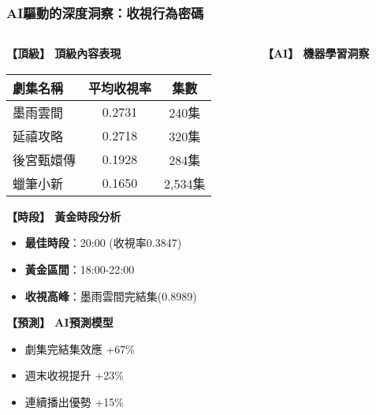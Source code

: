 \documentclass[10pt]{beamer}
\begin{document}
\begin{frame}
\frametitle{AI驅動的深度洞察：收視行為密碼}

\begin{columns}[T]
\begin{column}{0.6\textwidth}
\textbf{【頂級】 頂級內容表現}
\begin{table}[h]
\centering
\small
\begin{tabular}{@{}lcc@{}}
\toprule
\textbf{劇集名稱} & \textbf{平均收視率} & \textbf{集數} \\
\midrule
墨雨雲間 & 0.2731 & 240集 \\
延禧攻略 & 0.2718 & 320集 \\
後宮甄嬛傳 & 0.1928 & 284集 \\
蠟筆小新 & 0.1650 & 2,534集 \\
\bottomrule
\end{tabular}
\end{table}

\textbf{【時段】 黃金時段分析}
\begin{itemize}
    \item \textbf{最佳時段}：20:00 (收視率0.3847)
    \item \textbf{黃金區間}：18:00-22:00
    \item \textbf{收視高峰}：墨雨雲間完結集(0.8989)
\end{itemize}

\textbf{【預測】 AI預測模型}
\begin{itemize}
    \item 劇集完結集效應 +67\%
    \item 週末收視提升 +23\%
    \item 連續播出優勢 +15\%
\end{itemize}
\end{column}

\begin{column}{0.4\textwidth}
\textbf{【AI】 機器學習洞察}



\end{column}
\end{columns}
\end{frame}
\end{document}
